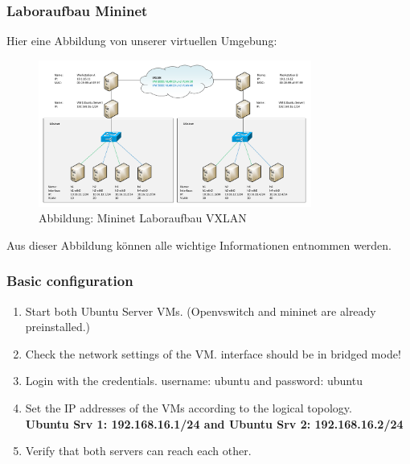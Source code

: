\documentclass[a4,12pt]{scrartcl}
\begin{document}
\subsubsection{Laboraufbau Mininet}
Hier eine Abbildung von unserer virtuellen Umgebung: 
\begin{figure} [H]
	\begin{center}
	\includegraphics[width=0.80\textwidth]{./draws/vxlan_ex4_laboraufbau.pdf}
	\caption{Abbildung: Mininet Laboraufbau VXLAN}
	\label{x}
	\end{center}
\end{figure}
Aus dieser Abbildung können alle wichtige Informationen entnommen werden. 

\subsubsection{Basic configuration}
\begin{enumerate}
\item Start both Ubuntu Server VMs. (Openvswitch and mininet are already preinstalled.)
\item Check the network settings of the VM. interface should be in bridged mode!
\item Login with the credentials. username: ubuntu and password: ubuntu
\item Set the IP addresses of the VMs according to the logical topology.\\
\textbf{Ubuntu Srv 1: 192.168.16.1/24 and Ubuntu Srv 2: 192.168.16.2/24}
\item Verify that both servers can reach each other.
\end{enumerate}
\end{document}
